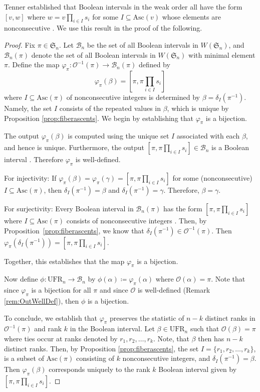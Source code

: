 \documentclass[11pt,reqno]{amsart}
\newcommand*{\Out}{\mathcal{O}}
\newcommand{\Asc}{\mathrm{Asc}}
\theoremstyle{definition}
\theoremstyle{notation}
\theoremstyle{openproblem}
\newcommand{\Sym}{\mathfrak{S}}
\newcommand{\UFR}[1]{\text{UFR}_{#1}}
\begin{document}
Tenner established that Boolean intervals in the weak order all have the form $[v,w]$ where $w= v \prod_{i\in I} s_i$ for some $I\subseteq \Asc(v) $ whose elements are nonconsecutive \cite[Corollary 4.4]{Tenner_Intervals}. 
We use this result in the proof of the following.

\nkThm*

\begin{proof}
Fix $\pi\in \Sym_{n}$.
Let $\mathcal{B}_n$ be the set of all Boolean intervals in $W(\Sym_n)$, and $\mathcal{B}_n(\pi)$ denote the set of all Boolean intervals in $W(\Sym_n)$ with minimal element $\pi$.
Define the map $\varphi_\pi: \Out^{-1}(\pi) \rightarrow \mathcal{B}_n(\pi)$ defined by
\[
    \varphi_\pi(\beta) = [\pi, \pi \prod_{i\in I} s_i]
\]
where $I \subseteq \Asc(\pi)$ of nonconsecutive integers is determined by $\beta=\delta_I(\pi^{-1})$. 
Namely, the set  $I$ consists of the repeated values in $\beta$, which is unique by Proposition \ref{prop:fiberascents}.
We begin by establishing that $\varphi_\pi$ is a bijection. 

The output $\varphi_\pi(\beta)$ is computed using the unique set $I$ associated with each $\beta$, and hence is unique. Furthermore, the output $[\pi, \pi \prod_{i\in I} s_i]\in \mathcal{B}_n$ is a Boolean interval \cite[Corollary 4.4]{Tenner_Intervals}.
Therefore $\varphi_\pi$ is well-defined.

For injectivity: If $\varphi_\pi(\beta)=\varphi_\pi(\gamma)=[\pi, \pi \prod_{i\in I} s_i]$ for some (nonconsecutive) $I\subseteq \Asc(\pi)$, then  $\delta_{I}(\pi^{-1})=\beta$
and $\delta_{I}(\pi^{-1})=\gamma$. Therefore, $\beta=\gamma$.

For surjectivity: Every Boolean interval in $\mathcal{B}_n(\pi)$ has the form $[\pi, \pi \prod_{i\in I} s_i]$ where $I\subseteq \Asc(\pi)$ consists of nonconsecutive integers \cite[Corollary 4.4]{Tenner_Intervals}. Then, by Proposition~\ref{prop:fiberascents}, we know that $\delta_{I}(\pi^{-1})\in\Out^{-1}(\pi)$. Then $\varphi_\pi(\delta_I(\pi^{-1}))=[\pi, \pi \prod_{i\in I} s_i]$.

Together, this establishes that the map $\varphi_\pi$ is a bijection. 

Now define 
$\phi:\UFR{n}\to\mathcal{B}_n$ by
$\phi(\alpha)\coloneqq\varphi_\pi(\alpha)$
where $\Out(\alpha)=\pi$.
Note that since $\varphi_\pi$ is a bijection for all $\pi$ and since $\Out$ is well-defined (Remark \ref{rem:OutWellDef}), then $\phi$ is a bijection.


To conclude, we establish that $\varphi_\pi$ preserves the statistic of $n-k$ distinct ranks in $\Out^{-1}(\pi)$ and rank $k$ in the Boolean interval. 
Let $\beta \in \UFR{n}$ such that $\Out(\beta)=\pi$ where ties occur at ranks denoted by $r_1,r_2,\ldots,r_k$. Note, that $\beta$ then has $n-k$ distinct ranks.
Then, by Proposition \ref{prop:fiberascents}, the set $I=\{r_1,r_2,\ldots ,r_{k}\}$, is a subset of $\Asc(\pi)$ consisting of $k$ nonconsecutive integers, and $\delta_I(\pi^{-1})=\beta$. 
Then $\varphi_\pi(\beta)$ corresponds uniquely to the rank $k$ Boolean interval given by $[\pi, \pi \prod_{i\in I} s_i]$.
\end{proof}
\end{document}
